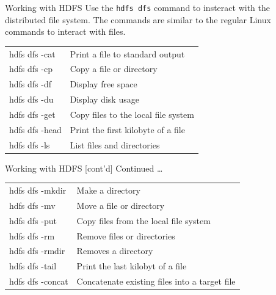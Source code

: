 \documentclass[ignorenonframetext,xcolor=x11names]{beamer}
\begin{document}

\begin{frame}{Working with HDFS}
Use the \texttt{hdfs dfs} command to insteract with the distributed file system. The commands are similar to the regular Linux commands to interact with files. \\

\renewcommand{\arraystretch}{1.25}
\begin{tabular}{l|l} \hline
hdfs dfs -cat & Print a file to standard output \\
hdfs dfs -cp & Copy a file or directory\\
hdfs dfs -df & Display free space \\
hdfs dfs -du & Display disk usage \\
hdfs dfs -get & Copy files to the local file system \\
hdfs dfs -head & Print the first kilobyte of a file \\
hdfs dfs -ls & List files and directories \\ \hline
\end{tabular}
\end{frame}


\begin{frame}{Working with HDFS \small [cont'd]}
Continued \ldots \\

\renewcommand{\arraystretch}{1.25}
\begin{tabular}{l|l} \hline
hdfs dfs -mkdir & Make a directory \\
hdfs dfs -mv & Move a file or directory \\
hdfs dfs -put & Copy files from the local file system \\
hdfs dfs -rm & Remove files or directories \\
hdfs dfs -rmdir & Removes a directory \\
hdfs dfs -tail & Print the last kilobyt of a file \\
hdfs dfs -concat & Concatenate existing files into a target file \\ \hline
\end{tabular}
\end{frame}
\end{document}
